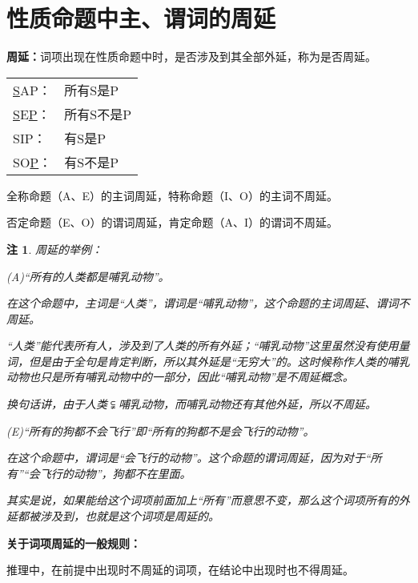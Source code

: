 \documentclass[12pt,onecolumn,a4paper]{book}
\newtheorem*{note}{注}
\numberwithin{table}{subsection}
\numberwithin{equation}{subsection}
\begin{document}
\section{性质命题中主、谓词的周延}

\textbf{周延：}词项出现在性质命题中时，是否涉及到其全部外延，称为是否周延。

\begin{center}
    \begin{tabular}{ll}
        \underline{S}AP：&所有S是P\\

        \underline{S}E\underline{P}：&所有S不是P\\

        SIP：&有S是P\\

        SO\underline{P}：&有S不是P\\
    \end{tabular}   
\end{center}

全称命题（A、E）的主词周延，特称命题（I、O）的主词不周延。

否定命题（E、O）的谓词周延，肯定命题（A、I）的谓词不周延。

\begin{note}
    周延的举例：

    (A)“所有的人类都是哺乳动物”。
    
    在这个命题中，主词是“人类”，谓词是“哺乳动物”，这个命题的主词周延、谓词不周延。
    
    “人类”能代表所有人，涉及到了人类的所有外延；“哺乳动物”这里虽然没有使用量词，但是由于全句是肯定判断，所以其外延是“无穷大”的。这时候称作人类的哺乳动物也只是所有哺乳动物中的一部分，因此“哺乳动物”是不周延概念。

    换句话讲，由于人类$\subsetneqq$哺乳动物，而哺乳动物还有其他外延，所以不周延。

    (E)“所有的狗都不会飞行”即“所有的狗都不是会飞行的动物”。
    
    在这个命题中，谓词是“会飞行的动物”。这个命题的谓词周延，因为对于“所有”“会飞行的动物”，狗都不在里面。

    其实是说，如果能给这个词项前面加上“所有”而意思不变，那么这个词项所有的外延都被涉及到，也就是这个词项是周延的。
\end{note}

\textbf{关于词项周延的一般规则：}

推理中，在前提中出现时不周延的词项，在结论中出现时也不得周延。
\end{document}
